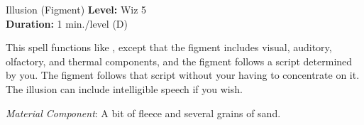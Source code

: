 {Illusion (Figment)}
{
	\textbf{Level:}
	Wiz 5\\
	\textbf{Duration:}
	1 min./level (D)\\
}
{
	This spell functions like , except that the figment includes visual, auditory, olfactory, and thermal components, and the figment follows a script determined by you. The figment follows that script without your having to concentrate on it. The illusion can include intelligible speech if you wish.

	\textit{Material Component}:
	A bit of fleece and several grains of sand.

}
